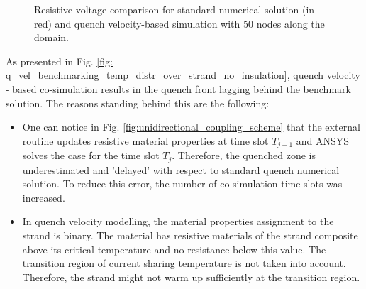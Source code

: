 \begin{figure}[h!]
\centering
    \caption{Resistive voltage comparison for standard numerical solution (in red) and quench velocity-based simulation with 50 nodes along the domain.}
    \label{fig: q_vel_modelling_res_volt_benchmarking}
\end{figure}

As presented in Fig. \ref{fig: q_vel_benchmarking_temp_distr_over_strand_no_insulation}, quench velocity - based co-simulation results in the quench front lagging behind the benchmark solution. The reasons standing behind this are the following: 
\begin{itemize}
    \item One can notice in Fig. \ref{fig:unidirectional_coupling_scheme} that the external routine updates resistive material properties at time slot $T_{j-1}$ and ANSYS solves the case for the time slot $T_{j}$. Therefore, the quenched zone is underestimated and 'delayed' with respect to standard quench numerical solution. To reduce this error, the number of co-simulation time slots was increased. 
    \item In quench velocity modelling, the material properties assignment to the strand is binary. The material has resistive materials of the strand composite above its critical temperature and no resistance below this value. The transition region of current sharing temperature is not taken into account. Therefore, the strand might not warm up sufficiently at the transition region.
\end{itemize}

